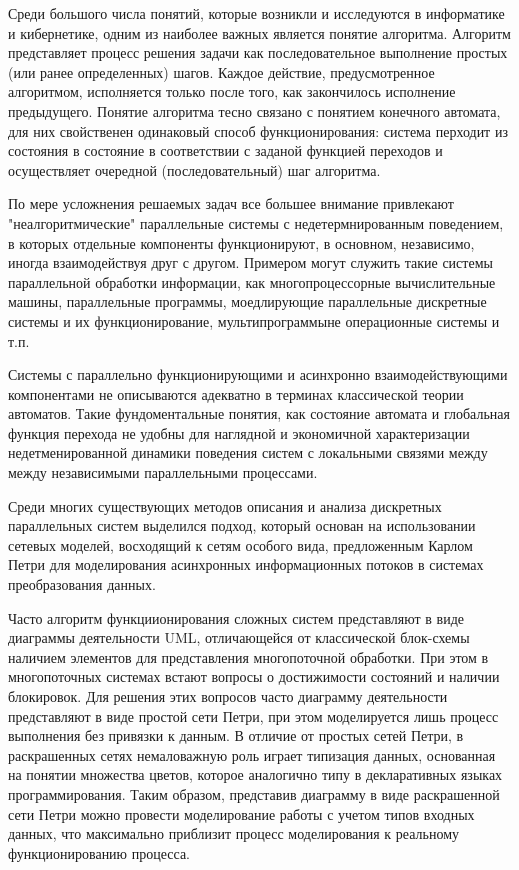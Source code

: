 \Introduction

Среди большого числа понятий, которые возникли и исследуются в информатике и кибернетике, одним из наиболее важных является понятие алгоритма. Алгоритм представляет процесс решения задачи как последовательное выполнение простых (или ранее определенных) шагов. Каждое действие, предусмотренное алгоритмом, исполняется только после того, как закончилось исполнение предыдущего. Понятие алгоритма тесно связано с понятием конечного автомата, для них свойственен одинаковый способ функционирования: система перходит из состояния в состояние в соответствии с заданой функцией переходов и осуществляет очередной (последовательный) шаг алгоритма.

По мере усложнения решаемых задач все большее внимание привлекают "неалгоритмические" параллельные системы с недетермнированным поведением, в которых отдельные компоненты функционируют, в основном, независимо, иногда взаимодействуя друг с другом. Примером могут служить такие системы параллельной обработки информации, как многопроцессорные вычислительные машины, параллельные программы, моедлирующие параллельные дискретные системы и их функционирование, мультипрограммыне операционные системы и т.п.

Системы с параллельно функционирующими и асинхронно взаимодействующими компонентами не описываются адекватно в терминах классической теории автоматов. Такие фундоментальные понятия, как состояние автомата и глобальная функция перехода не удобны для наглядной и экономичной характеризации недетменированной динамики поведения систем с локальными связями между между независимыми параллельными процессами.

Среди многих существующих методов описания и анализа дискретных параллельных систем выделился подход, который основан на использовании сетевых моделей, восходящий к сетям особого вида, предложенным Карлом Петри для моделирования асинхронных информационных потоков в системах преобразования данных.

Часто алгоритм функциионирования сложных систем представляют в виде диаграммы деятельности UML, отличающейся от классической блок-схемы наличием элементов для представления многопоточной обработки. При этом в многопоточных системах встают вопросы о достижимости состояний и наличии блокировок. Для решения этих вопросов часто диаграмму деятельности представляют в виде простой сети Петри, при этом моделируется лишь процесс выполнения без привязки к данным. В отличие от простых сетей Петри, в раскрашенных сетях немаловажную роль играет типизация данных, основанная на понятии множества цветов, которое аналогично типу в декларативных языках программирования. Таким образом, представив диаграмму в виде раскрашенной сети Петри можно провести моделирование работы с учетом типов входных данных, что максимально приблизит процесс моделирования к реальному функционированию процесса.

